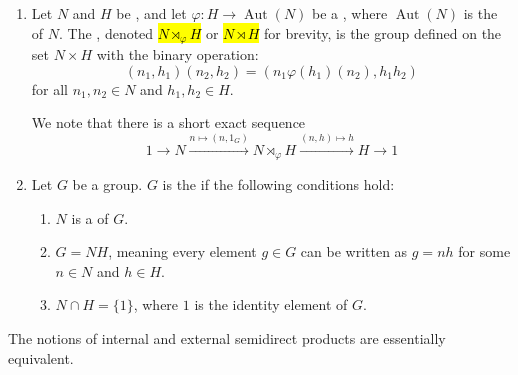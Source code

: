\begin{definition} \label{definition:semidirect_product_of_groups_external_and_internal}
    \begin{enumerate}
        \item Let $N$ and $H$ be , and let $\varphi: H \to \operatorname{Aut}(N)$ be a , where $\operatorname{Aut}(N)$ is the  of $N$. The , denoted \hl{$N \rtimes_\varphi H$} or \hl{$N \rtimes H$} for brevity, is the group defined on the set $N \times H$ with the binary operation:
        $$ (n_1, h_1)(n_2, h_2) = (n_1 \varphi(h_1)(n_2), h_1 h_2) $$
        for all $n_1, n_2 \in N$ and $h_1, h_2 \in H$.

        We note that there is a short exact sequence
        $$1 \to N \xrightarrow{n \mapsto (n,1_G)} N \rtimes_\varphi H \xrightarrow{(n,h) \mapsto h} H \to 1$$
         

        \item Let $G$ be a group. $G$ is the  if the following conditions hold:
        \begin{enumerate}
            \item $N$ is a  of $G$.
            \item $G = NH$, meaning every element $g \in G$ can be written as $g = nh$ for some $n \in N$ and $h \in H$.
            \item $N \cap H = \{1\}$, where $1$ is the identity element of $G$.
        \end{enumerate}
    \end{enumerate}
    The notions of internal and external semidirect products are essentially equivalent.
\end{definition}